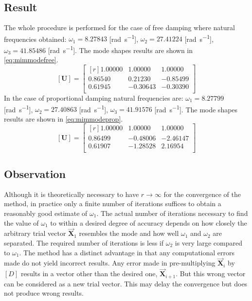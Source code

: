 \subsection{Result}
\label{ssec:resultmim}
The whole procedure is performed for the case of free damping where natural 
frequencies obtained: \(\omega_{1} = 8.27843\) [\si{\radian\per\second}], 
\(\omega_{2}= 27.41224\) [\si{\radian\per\second}], \(\omega_{3} = 41.85486\)
[\si{\radian\per\second}].
The mode shapes results are shown in \eqref{eq:mimmodefree}.
\begin{equation}\label{eq:mimmodefree}
 [\mathbf{U}] = \begin{bmatrix*}[r]
	1.00000 & 1.00000 & 1.00000 \\
	0.86540 & 0.21230 &-0.85499 \\
	0.61945 &-0.30643 &-0.30390 \\
	 \end{bmatrix*}
\end{equation}
%
In the case of proportional damping natural frequencies are:
\(\omega_{1} = 8.27799\) [\si{\radian\per\second}], \(\omega_{2} = 27.40863\)
[\si{\radian\per\second}], \(\omega_{3} = 41.91576\) [\si{\radian\per\second}].
The mode shapes results are shown in \eqref{eq:mimmodeprop}.
 \begin{equation}\label{eq:mimmodeprop}
 [\mathbf{U}] = \begin{bmatrix*}[r]
	1.00000 & 1.00000 & 1.00000 \\
	0.86499 &-0.48006 &-2.46147 \\
	0.61907 &-1.28528 & 2.16954 \\
	 \end{bmatrix*}
\end{equation}
\subsection{Observation}\label{ssec:observationmim}
Although it is theoretically necessary to have \(r\rightarrow\infty\) for the 
convergence of the method, in practice only a finite number of iterations
suffices to obtain a reasonably good estimate of \(\omega_{1}\).
The actual number of iterations necessary to find the value of \(\omega_1\) to
within a desired degree of accuracy depends on how closely the arbitrary trial
vector \(\vec{\mathbf{X}}_{1}\) resembles the mode and how well \(\omega_1\)
and \(\omega_2\) are separated.
The required number of iterations is less if \(\omega_2\) is very large compared
to \(\omega_{1}\).
The method has a distinct advantage in that any computational errors made do not
yield incorrect results. Any error made in pre-multiplying
\(\vec{\mathbf{X}}_{i}\) by \([D]\) results in a vector other than the desired
one, \(\vec{\mathbf{X}}_{i+1}\).
But this wrong vector can be considered as a new trial vector.
This may delay the convergence but does not produce wrong results.
